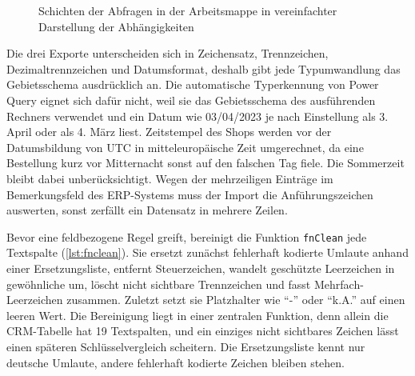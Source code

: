 \documentclass[a4paper,12pt]{article}
\newcommand{\pq}[1]{\texttt{#1}}        %
\begin{document}
\begin{figure}[H]
{}
\caption{Schichten der Abfragen in der Arbeitsmappe in vereinfachter Darstellung der Abhängigkeiten}
\label{fig:abhaengigkeiten}
\end{figure}

Die drei Exporte unterscheiden sich in Zeichensatz, Trennzeichen, Dezimaltrennzeichen und Datumsformat, deshalb gibt jede Typumwandlung das Gebietsschema ausdrücklich an. Die automatische Typerkennung von Power Query eignet sich dafür nicht, weil sie das Gebietsschema des ausführenden Rechners verwendet und ein Datum wie 03/04/2023 je nach Einstellung als 3. April oder als 4. März liest. Zeitstempel des Shops werden vor der Datumsbildung von UTC in mitteleuropäische Zeit umgerechnet, da eine Bestellung kurz vor Mitternacht sonst auf den falschen Tag fiele. Die Sommerzeit bleibt dabei unberücksichtigt. Wegen der mehrzeiligen Einträge im Bemerkungsfeld des ERP-Systems muss der Import die Anführungszeichen auswerten, sonst zerfällt ein Datensatz in mehrere Zeilen.

Bevor eine feldbezogene Regel greift, bereinigt die Funktion \pq{fnClean} jede Textspalte (\cref{lst:fnclean}). Sie ersetzt zunächst fehlerhaft kodierte Umlaute anhand einer Ersetzungsliste, entfernt Steuerzeichen, wandelt geschützte Leerzeichen in gewöhnliche um, löscht nicht sichtbare Trennzeichen und fasst Mehrfach-Leerzeichen zusammen. Zuletzt setzt sie Platzhalter wie \enquote{-} oder \enquote{k.A.} auf einen leeren Wert. Die Bereinigung liegt in einer zentralen Funktion, denn allein die CRM-Tabelle hat 19 Textspalten, und ein einziges nicht sichtbares Zeichen lässt einen späteren Schlüsselvergleich scheitern. Die Ersetzungsliste kennt nur deutsche Umlaute, andere fehlerhaft kodierte Zeichen bleiben stehen.
\end{document}
